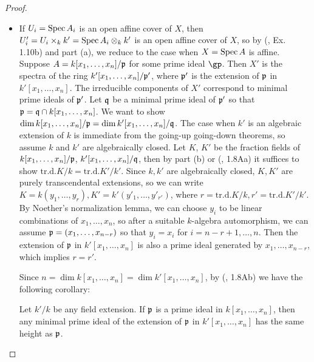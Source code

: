 \documentclass[a4paper]{article}
\begin{document}
\begin{enumerate} [label=\textbf{\arabic*.}, leftmargin=0em]
\begin{proof}
\begin{itemize} [leftmargin=0cm]
                  \item[(f)] If $U_i = \operatorname{Spec}{A_i}$ is an open affine cover of $X$, then $U_i' = U_i \times_k k' = \operatorname{Spec}{A_i \otimes_k k'}$ is an open affine cover of $X$, so by (, Ex. 1.10b) and part (a), we reduce to the case when $X = \operatorname{Spec}{A}$ is affine.
                  Suppose $A = k[x_1, \dots, x_n] / \mathfrak{p}$ for some prime ideal $\gp$.
                  Then $X'$ is the spectra of the ring $k'[x_1, \dots, x_n]/\mathfrak{p}'$, where $\mathfrak{p}'$ is the extension of $\mathfrak{p}$ in $k'[x_1, \dots, x_n]$.
                  The irreducible components of $X'$ correspond to minimal prime ideals of $\mathfrak{p}'$.
                  Let $\mathfrak{q}$ be a minimal prime ideal of $\mathfrak{p}'$ so that $\mathfrak{p} = \mathfrak{q} \cap k[x_1, \dots, x_n]$.
                  We want to show $\dim{k[x_1, \dots, x_n] / \mathfrak{p}} = \dim{k'[x_1, \dots, x_n] / \mathfrak{q}}$. The case when $k'$ is an algebraic extension of $k$ is immediate from the going-up going-down theorems, so assume $k$ and $k'$ are algebraically closed. Let $K$, $K'$ be the fraction fields of $k[x_1, \dots, x_n] / \mathfrak{p}$, $k'[x_1, \dots, x_n] / \mathfrak{q}$, then by part (b) or (, 1.8Aa) it suffices to show $\text{tr.d.} K/k = \text{tr.d.} K'/k'$. Since $k, k'$ are algebraically closed, $K, K'$ are purely transcendental extensions, so we can write $K = k(y_1, \dots, y_r), K' = k'(y'_1, \dots, y'_{r'})$, where $r = \text{tr.d.}K/k, r' = \text{tr.d.}K'/k'$.
                  By Noether's normalization lemma, we can choose $y_i$ to be linear combinations of $x_1, \dots, x_n$, so after a suitable $k$-algebra automorphism, we can assume $\mathfrak{p} = (x_1, \dots, x_{n - r})$ so that $y_i = x_i$ for $i = n - r + 1, \dots, n$. Then the extension of $\mathfrak{p}$ in $k'[x_1, \dots, x_n]$ is also a prime ideal generated by $x_1, \dots, x_{n - r}$, which implies $r = r'$.

                        Since $n = \dim{k[x_1, \dots, x_n]} = \dim{k'[x_1, \dots, x_n]}$, by (, 1.8Ab) we have the following corollary:
                        \begin{corollary}
                            Let $k'/k$ be any field extension. If $\mathfrak{p}$ is a prime ideal in $k[x_1, \dots, x_n]$, then any minimal prime ideal of the extension of $\mathfrak{p}$ in $k'[x_1, \dots, x_n]$ has the same height as $\mathfrak{p}$.
                        \end{corollary}
              \end{itemize}
          \end{proof}

\end{enumerate}
\end{document}
